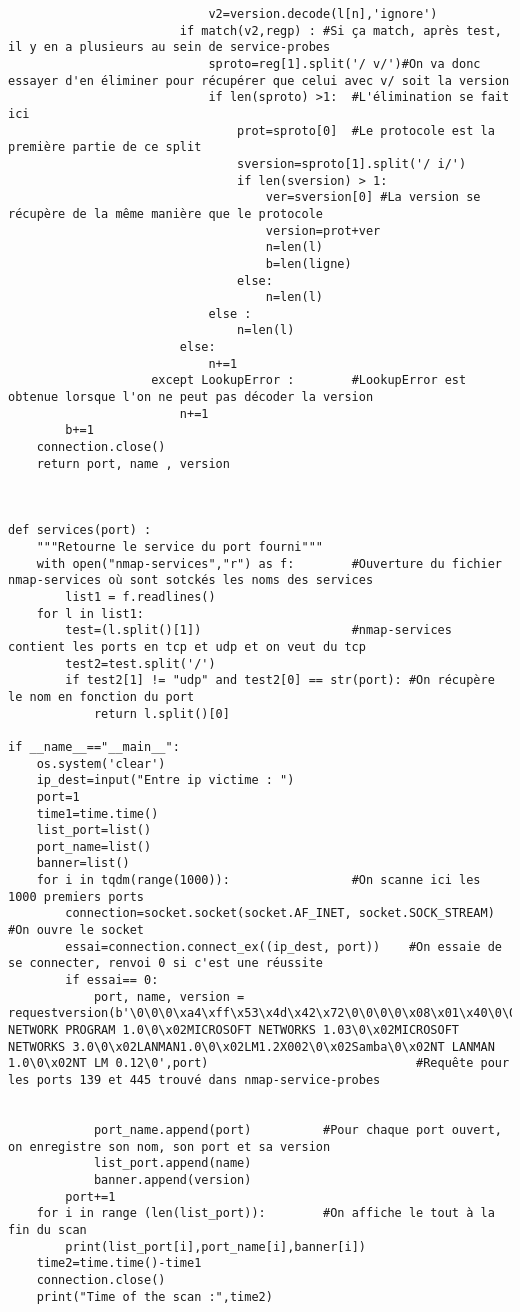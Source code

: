 \begin{appendix}
\begin{lstlisting}
							v2=version.decode(l[n],'ignore')
						if match(v2,regp) :	#Si ça match, après test, il y en a plusieurs au sein de service-probes
							sproto=reg[1].split('/ v/')#On va donc essayer d'en éliminer pour récupérer que celui avec v/ soit la version
							if len(sproto) >1:	#L'élimination se fait ici
								prot=sproto[0]	#Le protocole est la première partie de ce split
								sversion=sproto[1].split('/ i/')
								if len(sversion) > 1:
									ver=sversion[0]	#La version se récupère de la même manière que le protocole
									version=prot+ver
									n=len(l)
									b=len(ligne)
								else:
									n=len(l)
							else :
								n=len(l)
						else:
							n+=1
					except LookupError :		#LookupError est obtenue lorsque l'on ne peut pas décoder la version
						n+=1
		b+=1
	connection.close()
	return port, name , version



def services(port) :							
	"""Retourne le service du port fourni"""
	with open("nmap-services","r") as f:		#Ouverture du fichier nmap-services où sont sotckés les noms des services
		list1 = f.readlines()
	for l in list1:
		test=(l.split()[1])						#nmap-services contient les ports en tcp et udp et on veut du tcp
		test2=test.split('/')
		if test2[1] != "udp" and test2[0] == str(port): #On récupère le nom en fonction du port
			return l.split()[0]

if __name__=="__main__":	
	os.system('clear')
	ip_dest=input("Entre ip victime : ")
	port=1
	time1=time.time()
	list_port=list()
	port_name=list()
	banner=list()
	for i in tqdm(range(1000)):					#On scanne ici les 1000 premiers ports
		connection=socket.socket(socket.AF_INET, socket.SOCK_STREAM) #On ouvre le socket
		essai=connection.connect_ex((ip_dest, port))	#On essaie de se connecter, renvoi 0 si c'est une réussite
		if essai== 0:
			port, name, version = requestversion(b'\0\0\0\xa4\xff\x53\x4d\x42\x72\0\0\0\0\x08\x01\x40\0\0\0\0\0\0\0\0\0\0\0\0\0\0\x40\x06\0\0\x01\0\0\x81\0\x02PC NETWORK PROGRAM 1.0\0\x02MICROSOFT NETWORKS 1.03\0\x02MICROSOFT NETWORKS 3.0\0\x02LANMAN1.0\0\x02LM1.2X002\0\x02Samba\0\x02NT LANMAN 1.0\0\x02NT LM 0.12\0',port)								#Requête pour les ports 139 et 445 trouvé dans nmap-service-probes


			port_name.append(port)			#Pour chaque port ouvert, on enregistre son nom, son port et sa version
			list_port.append(name)
			banner.append(version)
		port+=1
	for i in range (len(list_port)):		#On affiche le tout à la fin du scan
		print(list_port[i],port_name[i],banner[i])
	time2=time.time()-time1
	connection.close()
	print("Time of the scan :",time2)
\end{lstlisting}
\label{fig:prog1}

\end{appendix}